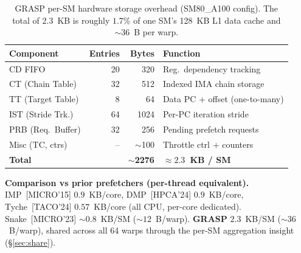 \begin{table}[t]
  \centering
  \caption{GRASP per-SM hardware storage overhead (SM80\_A100 config). The
    total of 2.3~KB is roughly $1.7\%$ of one SM's 128~KB L1 data cache and
    $\sim 36$~B per warp.}
  \label{tab:grasp_cost}
  \footnotesize
  \setlength{\tabcolsep}{4pt}
  \begin{tabular}{lrrl}
    \toprule
    \textbf{Component} & \textbf{Entries} & \textbf{Bytes} & \textbf{Function} \\
    \midrule
    CD FIFO            &  20 &      320 & Reg.\ dependency tracking \\
    CT (Chain Table)   &  32 &      512 & Indexed IMA chain storage \\
    TT (Target Table)  &   8 &       64 & Data PC + offset (one-to-many) \\
    IST (Stride Trk.)  &  64 &     1024 & Per-PC iteration stride \\
    PRB (Req.\ Buffer) &  32 &      256 & Pending prefetch requests \\
    Misc (TC, ctrs)    &  -- & $\sim$100 & Throttle ctrl + counters \\
    \midrule
    \textbf{Total}     &     & \textbf{$\sim$2276} & \textbf{$\approx 2.3$~KB / SM} \\
    \bottomrule
  \end{tabular}

  \vspace{0.5em}
  \footnotesize
  \textbf{Comparison vs prior prefetchers (per-thread equivalent).}
  IMP~[MICRO'15] $0.9$~KB/core, DMP~[HPCA'24] $0.9$~KB/core,
  Tyche~[TACO'24] $0.57$~KB/core (all CPU, per-core dedicated).
  Snake~[MICRO'23] $\sim 0.8$~KB/SM ($\sim 12$~B/warp).
  \textbf{GRASP} $2.3$~KB/SM ($\sim 36$~B/warp), shared across all 64 warps
  through the per-SM aggregation insight (\S\ref{sec:share}).
\end{table}
